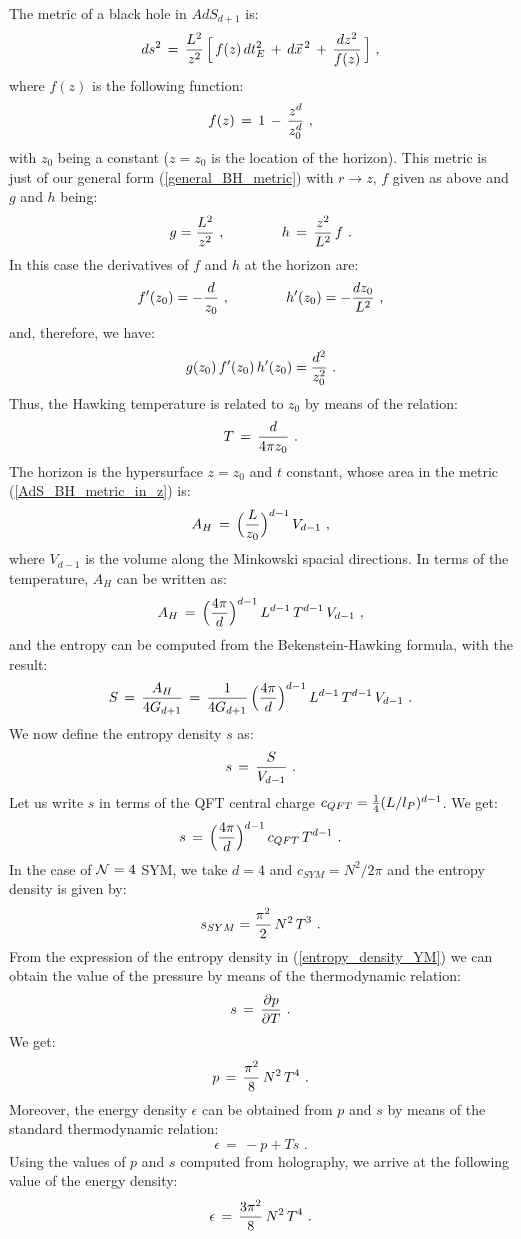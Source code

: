 \documentclass[12pt,notitlepage]{article}
\newcommand{\beq}{\begin{equation}}
\newcommand{\eeq}{\end{equation}}
\begin{document}
The metric of a black hole in $AdS_{d+1}$ is:
\beq
ds^2\,=\,{L^2\over z^2}\,\Big[\,f(z)\,dt_E^2\,+\,d\vec x^{\,2}\,+\,{dz^2\over f(z)}\,\Big]\,\,,
\label{AdS_BH_metric_in_z}
\eeq
 where $f(z)$ is the following function:
 \beq
 f(z)\,=\,1\,-\,{z^d\over z_0^d}\,\,,
 \eeq
with $z_0$ being a constant ($z=z_0$ is the location of the horizon). 
This metric is  just of our general form (\ref{general_BH_metric}) with $r\to z$, $f$ given as above and $g$  and $h$ being:
 \beq
 g={L^2\over z^2}
 \,\,, \qquad\qquad
 h\,=\,{z^2\over L^2}\,f\,\,.
 \eeq
In this case the derivatives of $f$ and $h$ at the horizon are:
\beq
f'(z_0)=-{d\over z_0}
 \,\,, \qquad\qquad
 h'(z_0)=-{d z_0\over L^2}\,\,,
 \eeq
and, therefore, we have:
\beq
g(z_0)\,f'(z_0)\,h'(z_0)={d^2\over z_0^2}\,\,.
\eeq
Thus, the Hawking temperature is related to $z_0$ by means of the relation:
\beq
T\,=\,{d\over 4\pi z_0}\,\,.
\eeq
The horizon is the hypersurface $z=z_0$ and $t$ constant, whose area  in the metric (\ref{AdS_BH_metric_in_z}) is:
\beq
A_H\,=\,\Big({L\over z_0}\Big)^{d-1}\,V_{d-1}\,\,,
\eeq
where $V_{d-1}$ is the volume along the Minkowski spacial directions. In terms of the temperature, $A_H$ can be written as:
\beq
A_H\,=\,\Big({4\pi\over d}\Big)^{d-1}\,L^{d-1}\,T^{d-1}\,
V_{d-1}\,\,,
\eeq
and the entropy can be computed from the Bekenstein-Hawking formula, with the result:
\beq
S\,=\,{A_H\over 4G_{d+1}}\,=\,{1\over 4G_{d+1}}\,
\Big({4\pi\over d}\Big)^{d-1}\,L^{d-1}\,T^{d-1}\,
V_{d-1}\,\,. 
\eeq
We now define the entropy density $s$ as:
\beq
s\,=\,{S\over V_{d-1}}\,\,.
\eeq
Let us write $s$ in terms of the QFT central charge $c_{QFT}={1\over 4}
(L/l_P)^{d-1}$. We get:
\beq
s\,=\,\Big({4\pi\over d}\Big)^{d-1}\,c_{QFT}\, T^{d-1}\,\,.
\eeq
In the case of  ${\cal N}=4$ SYM, we take  $d=4$ and $c_{SYM}= N^2/2\pi$ and the entropy density is given by:
\beq
s_{SYM}={\pi^2\over 2}\,N^2\,T^3\,\,.
\label{entropy_density_YM}
\eeq
From the expression of the entropy density  in (\ref{entropy_density_YM}) we can obtain the value of the pressure by means of the thermodynamic relation:
\beq
s\,=\,{\partial p\over \partial T}\,\,.
\label{s_p}
\eeq
We get:
\beq
p\,=\,{\pi^2\over 8}\,N^2\,T^4\,\,.
\eeq
Moreover, the energy density $\epsilon$ can be obtained from $p$ and $s$ by means of the standard thermodynamic relation:
\beq
\epsilon\,=\,-p+Ts\,\,.
\label{epsilon_p_s}
\eeq
Using the values of $p$ and $s$ computed from holography, we arrive at the following value of the energy density:
\beq
\epsilon\,=\,{3\pi^2\over 8}\,N^2\,T^4\,\,.
\eeq
\end{document}
